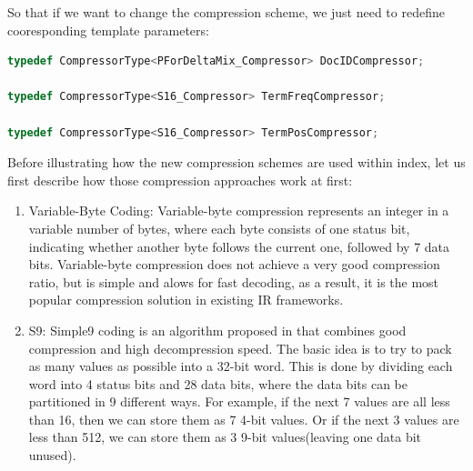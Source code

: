 So that if we want to change the compression scheme, we just need to redefine cooresponding template parameters:

\begin{lstlisting}[language=C]
typedef CompressorType<PForDeltaMix_Compressor> DocIDCompressor;

typedef CompressorType<S16_Compressor> TermFreqCompressor;

typedef CompressorType<S16_Compressor> TermPosCompressor;
\end{lstlisting}


Before illustrating how the new compression schemes are used within index, let us first describe how those compression approaches work at first:
\begin{enumerate}
 \item Variable-Byte Coding: Variable-byte compression represents an integer in a variable number of bytes, where each byte consists of one
status bit, indicating whether another byte follows the current one, followed by 7 data bits. Variable-byte compression does not achieve a very
good compression ratio, but is simple and alows for fast decoding, as a result, it is the most popular compression solution in existing IR frameworks.
 \item S9: Simple9 coding is an algorithm proposed in \cite{anh2005inverted} that combines good compression and high decompression speed. The basic
idea is to try to pack as many values as possible into a 32-bit word. This is done by dividing each word into 4 status bits and 28 data bits, where the
data bits can be partitioned in 9 different ways. For example, if the next 7 values are all less than 16, then we can store them as 7 4-bit values. Or
if the next 3 values are less than 512, we can store them as 3 9-bit values(leaving one data bit unused).


\end{enumerate}
